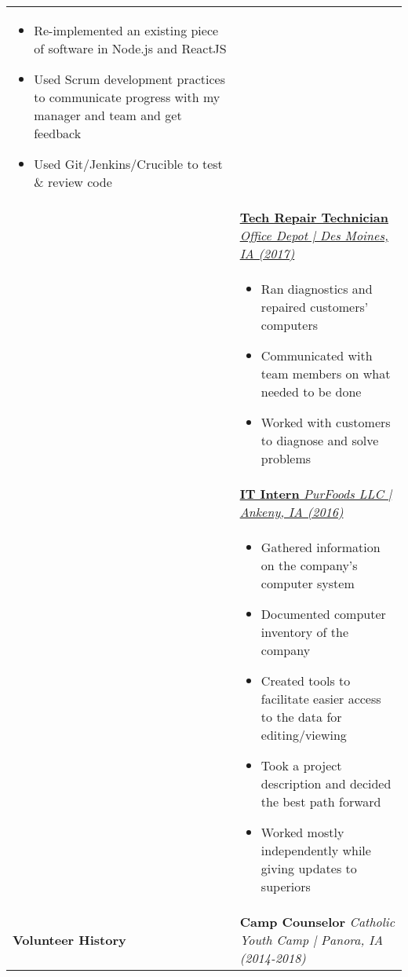 \documentclass[11pt]{article}
\begin{document}
\begin{small}
\begin{tabularx}{\textwidth}{lX}
		\begin{itemize}[noitemsep, nolistsep]
			\item Re-implemented an existing piece of software in Node.js and ReactJS
			\item Used Scrum development practices to communicate progress with my manager and team and get feedback
			\item Used Git/Jenkins/Crucible to test \& review code
		\end{itemize}\\
		&\uline{\textbf{Tech Repair Technician} \hfill \textit{Office Depot | Des Moines, IA (2017)}}\\
		& \vspace{-0.7\topsep}
		\begin{itemize}[noitemsep, nolistsep]
			\item Ran diagnostics and repaired customers' computers
			\item Communicated with team members on what needed to be done
			\item Worked with customers to diagnose and solve problems
		\end{itemize} \\
		& \uline{\textbf{IT Intern} \hfill \textit{PurFoods LLC | Ankeny, IA (2016)}} \\
		& \vspace{-0.7\topsep}
		\begin{itemize}[noitemsep, nolistsep]
			\item Gathered information on the company's computer system
			\item Documented computer inventory of the company
			\item Created tools to facilitate easier access to the data for editing/viewing
			\item Took a project description and decided the best path forward
			\item Worked mostly independently while giving updates to superiors
		\end{itemize}\\
		\begin{large}\textbf{Volunteer History}\end{large} & \textbf{Camp Counselor} \hfill \textit{Catholic Youth Camp | Panora, IA (2014-2018)}\\
	\end{tabularx}
	\end{small}
\end{document}
